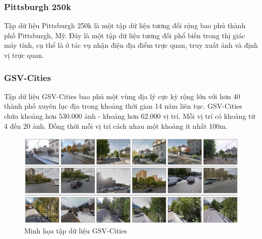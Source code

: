 \subsubsection*{Pittsburgh 250k \cite{6618963}}
Tập dữ liệu Pittsburgh 250k \cite{6618963} là một tập dữ liệu tương đối rộng bao phủ thành phố Pittsburgh, Mỹ. Đây là một tập dữ liệu tương đối phổ biến trong thị giác máy tính, cụ thể là ở tác vụ nhận điện địa điểm trực quan, truy xuất ảnh và định vị trực quan.

\subsubsection*{GSV-Cities \cite{Ali_bey_2022}}
Tập dữ liệu GSV-Cities \cite{Ali_bey_2022} bao phủ một vùng địa lý cực kỳ rộng lớn với hơn 40 thành phố xuyên lục địa trong khoảng thời gian 14 năm liên tục. GSV-Cities chứa khoảng hơn 530.000 ảnh - khoảng hơn 62.000 vị trí. Mỗi vị trí có khoảng từ 4 đến 20 ảnh. Đồng thời mỗi vị trí cách nhau một khoảng ít nhất 100m.
\begin{figure}[H]
    \centering
    \includegraphics[width=\textwidth]{pics/Chapter2/gsv.png}
    \caption{Minh họa tập dữ liệu GSV-Cities \cite{Ali_bey_2022}}
\end{figure}


